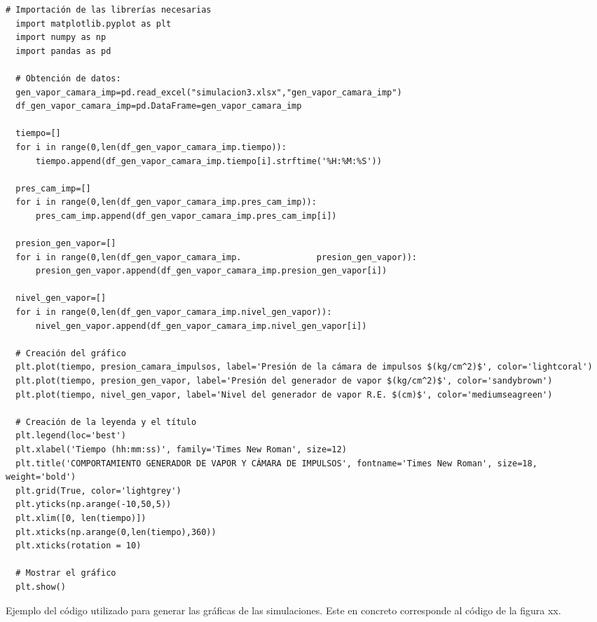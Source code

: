 \begin{code}[H]
\begin{lstlisting}[firstnumber=1, breakindent=55pt]
  # Importación de las librerías necesarias
  import matplotlib.pyplot as plt
  import numpy as np
  import pandas as pd

  # Obtención de datos:
  gen_vapor_camara_imp=pd.read_excel("simulacion3.xlsx","gen_vapor_camara_imp")
  df_gen_vapor_camara_imp=pd.DataFrame=gen_vapor_camara_imp

  tiempo=[]
  for i in range(0,len(df_gen_vapor_camara_imp.tiempo)):
      tiempo.append(df_gen_vapor_camara_imp.tiempo[i].strftime('%H:%M:%S'))
    
  pres_cam_imp=[]
  for i in range(0,len(df_gen_vapor_camara_imp.pres_cam_imp)):
      pres_cam_imp.append(df_gen_vapor_camara_imp.pres_cam_imp[i])

  presion_gen_vapor=[]
  for i in range(0,len(df_gen_vapor_camara_imp.               presion_gen_vapor)):
      presion_gen_vapor.append(df_gen_vapor_camara_imp.presion_gen_vapor[i])

  nivel_gen_vapor=[]
  for i in range(0,len(df_gen_vapor_camara_imp.nivel_gen_vapor)):
      nivel_gen_vapor.append(df_gen_vapor_camara_imp.nivel_gen_vapor[i])

  # Creación del gráfico
  plt.plot(tiempo, presion_camara_impulsos, label='Presión de la cámara de impulsos $(kg/cm^2)$', color='lightcoral')
  plt.plot(tiempo, presion_gen_vapor, label='Presión del generador de vapor $(kg/cm^2)$', color='sandybrown')
  plt.plot(tiempo, nivel_gen_vapor, label='Nivel del generador de vapor R.E. $(cm)$', color='mediumseagreen')

  # Creación de la leyenda y el título
  plt.legend(loc='best')
  plt.xlabel('Tiempo (hh:mm:ss)', family='Times New Roman', size=12)
  plt.title('COMPORTAMIENTO GENERADOR DE VAPOR Y CÁMARA DE IMPULSOS', fontname='Times New Roman', size=18, weight='bold')
  plt.grid(True, color='lightgrey')
  plt.yticks(np.arange(-10,50,5))
  plt.xlim([0, len(tiempo)])
  plt.xticks(np.arange(0,len(tiempo),360))
  plt.xticks(rotation = 10)

  # Mostrar el gráfico
  plt.show()
\end{lstlisting}
\vspace{-5pt}
\caption{Ejemplo del código utilizado para generar las gráficas de las simulaciones. Este en concreto corresponde al código de la figura xx.}
\label{cod:codigo_graficas}
\end{code}
